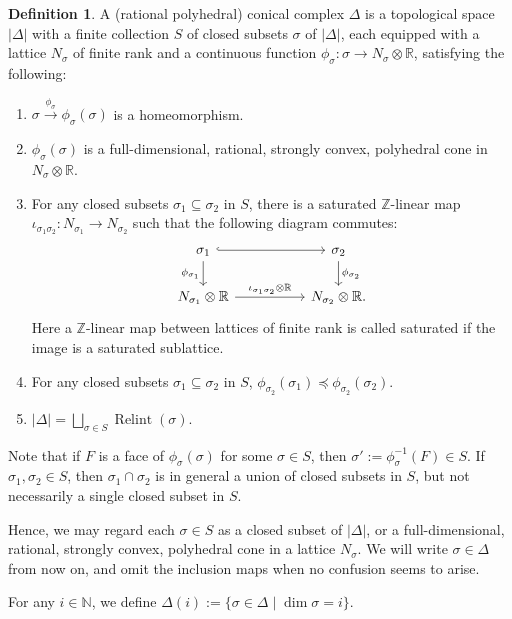 \documentclass[12pt,reqno]{amsart}
\theoremstyle{definition}
\newtheorem{definition}[theorem]{Definition}
\newcommand{\mb}{\mathbb}
\newcommand{\on}{\operatorname}
\newcommand\bN{{\mathbb N}}
\newcommand\bR{{\mathbb R}}
\newcommand\bZ{{\mathbb Z}}
\begin{document}
\begin{definition}
    A (rational polyhedral) conical complex $\Delta$ is a topological space $|\Delta|$ with a finite collection $S$ of closed subsets $\sigma$ of $|\Delta|$, each equipped with a lattice $N_{\sigma}$ of finite rank and a continuous function $\phi_\sigma\colon \sigma \to N_{\sigma}\otimes\bR$, satisfying the following:
    \begin{enumerate}
        \item $\sigma \xrightarrow{\phi_\sigma}\phi_\sigma(\sigma)$ is a homeomorphism. 
        \item $\phi_\sigma(\sigma)$ is a full-dimensional, rational, strongly convex, polyhedral cone in $N_\sigma\otimes\bR$. 
        \item For any closed subsets $\sigma_1\subseteq \sigma_2$ in $S$, there is a saturated $\bZ$-linear map $\iota_{\sigma_1\sigma_2}\colon N_{\sigma_1} \to N_{\sigma_2}$ such that the following diagram commutes:
        \[\begin{tikzcd}[column sep=5em]
            \sigma_1 \arrow[hook]{r}\arrow{d}[swap]{\phi_{\sigma_1}} & \sigma_2 \arrow{d}{\phi_{\sigma_2}} \\
            N_{\sigma_1}\otimes\bR \arrow{r}{\iota_{\sigma_1\sigma_2}\otimes\bR} & N_{\sigma_2}\otimes\bR.
        \end{tikzcd}\] 
        Here a $\mb Z$-linear map between lattices of finite rank is called saturated if the image is a saturated sublattice.
        \item For any closed subsets $\sigma_1\subseteq \sigma_2$ in $S$, $\phi_{\sigma_2}(\sigma_1)\preceq\phi_{\sigma_2}(\sigma_2)$.
        \item $|\Delta| = \bigsqcup_{\sigma\in S} \on{Relint}(\sigma)$. 
    \end{enumerate}
    Note that if $F$ is a face of $\phi_\sigma(\sigma)$ for some $\sigma\in S$, then $\sigma':=\phi_\sigma^{-1}(F)\in S$.
    If $\sigma_1, \sigma_2\in S$, then $\sigma_1\cap\sigma_2$ is in general a union of closed subsets in $S$, but not necessarily a single closed subset in $S$. 
\end{definition}

Hence, we may regard each $\sigma\in S$ as a closed subset of $|\Delta|$, or a full-dimensional, rational, strongly convex, polyhedral cone in a lattice $N_{\sigma}$. We will write $\sigma\in \Delta$ from now on, and omit the inclusion maps when no confusion seems to arise.

For any $i\in\bN$, we define $\Delta(i):=\{\sigma\in\Delta\mid\dim\sigma=i\}$. 
\end{document}

